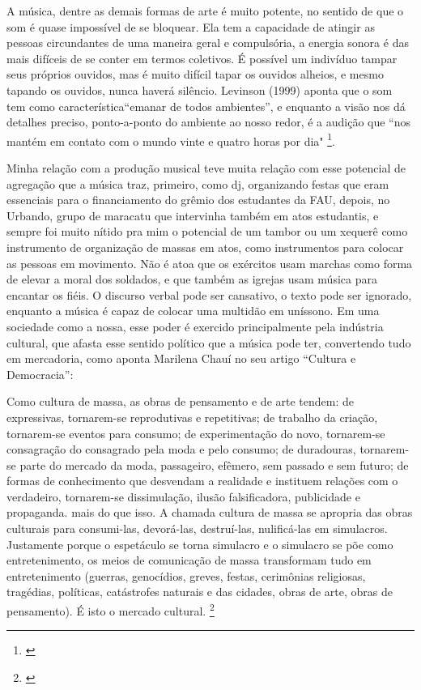 
A música, dentre as demais formas de arte é muito potente, no sentido de que o som é quase impossível de se bloquear. Ela tem a capacidade de atingir as pessoas circundantes de uma maneira geral e compulsória, a energia sonora é das mais difíceis de se conter em termos coletivos. É possível um indivíduo tampar seus próprios ouvidos, mas é muito difícil tapar os ouvidos alheios, e mesmo tapando os ouvidos, nunca haverá silêncio. Levinson (1999) aponta que o som tem como característica``emanar de todos ambientes'', e enquanto a visão nos dá detalhes preciso, ponto-a-ponto do ambiente ao nosso redor, é a audição que ``nos mantém em contato com o mundo vinte e quatro horas por dia" \footnote{\cite[47]{Levinson2001}}. 


Minha relação com a produção musical teve muita relação com esse potencial de agregação que a música traz, primeiro, como dj, organizando festas que eram essenciais para o financiamento do grêmio dos estudantes da FAU, depois, no Urbando, grupo de maracatu que intervinha também em atos estudantis, e sempre foi muito nítido pra mim o potencial de um tambor ou um xequerê como instrumento de organização de massas em atos, como instrumentos para colocar as pessoas em movimento. Não é atoa que os exércitos usam marchas como forma de elevar a moral dos soldados, e que também as igrejas usam música para encantar os fiéis. O discurso verbal pode ser cansativo, o texto pode ser ignorado, enquanto a música é capaz de colocar uma multidão em uníssono. Em uma sociedade como a nossa, esse poder é exercido principalmente pela indústria cultural, que afasta esse sentido político que a música pode ter, convertendo tudo em mercadoria, como aponta Marilena Chauí no seu artigo ``Cultura e Democracia'': 

\begin{citacao}

Como cultura de massa, as obras de pensamento e de arte tendem: de expressivas, tornarem-se reprodutivas e repetitivas; de trabalho da criação, tornarem-se eventos para consumo; de experimentação do novo, tornarem-se consagração do consagrado pela moda e pelo consumo; de duradouras, tornarem-se parte do mercado da moda, passageiro, efêmero, sem passado e sem futuro; de formas de conhecimento que desvendam a realidade e instituem relações com o verdadeiro, tornarem-se dissimulação, ilusão falsificadora, publicidade e propaganda. mais do que isso. A chamada cultura de massa se apropria das obras culturais para consumi-las, devorá-las, destruí-las, nulificá-las em simulacros. Justamente porque o espetáculo se torna simulacro e o simulacro se põe como entretenimento, os meios de comunicação de massa transformam tudo em entretenimento (guerras, genocídios, greves, festas, cerimônias religiosas, tragédias, políticas, catástrofes naturais e das cidades, obras de arte, obras de pensamento). É isto o mercado cultural. \footnote{\cite[61]{MarilenaChaui2008}}
\end{citacao}

